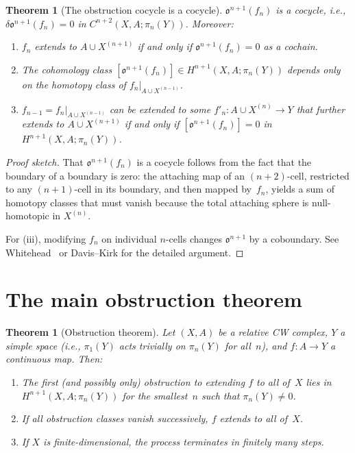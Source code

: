 \documentclass[12pt,a4paper,openany]{book}
\theoremstyle{definition}
\theoremstyle{plain}
\newtheorem{theorem}[definition]{Theorem}
\theoremstyle{remark}
\begin{document}
\begin{theorem}[The obstruction cocycle is a cocycle]
\label{thm:obstruction-cocycle}
$\mathfrak{o}^{n+1}(f_n)$ is a cocycle, i.e.,
$\delta\mathfrak{o}^{n+1}(f_n)=0$ in
$C^{n+2}(X,A;\pi_n(Y))$.  Moreover:
\begin{enumerate}[label=(\roman*)]
  \item $f_n$ extends to $A\cup X^{(n+1)}$ if and only if
    $\mathfrak{o}^{n+1}(f_n)=0$ as a cochain.
  \item The cohomology class
    $[\mathfrak{o}^{n+1}(f_n)]\in H^{n+1}(X,A;\pi_n(Y))$ depends only
    on the homotopy class of $f_n|_{A\cup X^{(n-1)}}$.
  \item $f_{n-1}=f_n|_{A\cup X^{(n-1)}}$ can be extended to some
    $f'_n\colon A\cup X^{(n)}\to Y$ that further extends to
    $A\cup X^{(n+1)}$ if and only if $[\mathfrak{o}^{n+1}(f_n)]=0$ in
    $H^{n+1}(X,A;\pi_n(Y))$.
\end{enumerate}
\end{theorem}

\begin{proof}[Proof sketch]
That $\mathfrak{o}^{n+1}(f_n)$ is a cocycle follows from the fact
that the boundary of a boundary is zero: the attaching map of an
$(n{+}2)$-cell, restricted to any $(n{+}1)$-cell in its boundary, and
then mapped by~$f_n$, yields a sum of homotopy classes that must
vanish because the total attaching sphere is null-homotopic in
$X^{(n)}$.

For (iii), modifying $f_n$ on individual $n$-cells changes
$\mathfrak{o}^{n+1}$ by a coboundary.  See Whitehead~\cite{spanier}
or Davis--Kirk for the detailed argument.
\end{proof}

\section{The main obstruction theorem}\label{sec:main-obstruction}

\begin{theorem}[Obstruction theorem]\label{thm:obstruction-main}
Let $(X,A)$ be a relative CW complex, $Y$ a simple space
(i.e., $\pi_1(Y)$ acts trivially on $\pi_n(Y)$ for all~$n$), and
$f\colon A\to Y$ a continuous map.  Then:
\begin{enumerate}[label=(\roman*)]
  \item The first (and possibly only) obstruction to extending $f$ to
    all of~$X$ lies in $H^{n+1}(X,A;\pi_n(Y))$ for the smallest~$n$
    such that $\pi_n(Y)\ne0$.
  \item If all obstruction classes vanish successively, $f$ extends to
    all of~$X$.
  \item If $X$ is finite-dimensional, the process terminates in
    finitely many steps.
\end{enumerate}
\end{theorem}
\end{document}
